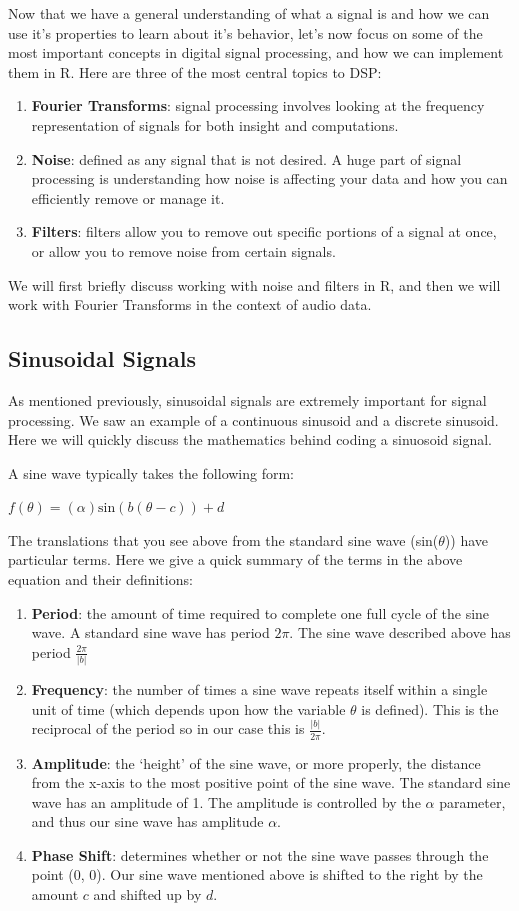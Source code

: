 \documentclass[12pt,oneside]{book}\usepackage[]{graphicx}\usepackage[]{color}
\newcommand{\be}{\begin{enumerate}}
\newcommand{\ee}{\end{enumerate}}
\begin{document}
{{{{Now that we have a general understanding of what a signal is and how we can use it's properties to learn about it's behavior, let's now focus on some of the most important concepts in digital signal processing, and how we can implement them in R. Here are three of the most central topics to DSP:

\be
\item \textbf{Fourier Transforms}: signal processing involves looking at the frequency representation of signals for both insight and computations.
\item \textbf{Noise}: defined as any signal that is not desired. A huge part of signal processing is understanding how noise is affecting your data and how you can efficiently remove or manage it.
\item \textbf{Filters}: filters allow you to remove out specific portions of a signal at once, or allow you to remove noise from certain signals.
\ee

We will first briefly discuss working with noise and filters in R, and then we will work with Fourier Transforms in the context of audio data.

\subsection{Sinusoidal Signals}

As mentioned previously, sinusoidal signals are extremely important for signal processing. We saw an example of a continuous sinusoid and a discrete sinusoid. Here we will quickly discuss the mathematics behind coding a sinuosoid signal. 

A sine wave typically takes the following form:

\begin{center}
$f(\theta) = (\alpha) \text{sin}(b(\theta - c)) + d$
\end{center}

The translations that you see above from the standard sine wave (sin($\theta$)) have particular terms. Here we give a quick summary of the terms in the above equation and their definitions:

\be
\item \textbf{Period}: the amount of time required to complete one full cycle of the sine wave. A standard sine wave has period $2\pi$. The sine wave described above has period $\frac{2\pi}{|b|}$
\item \textbf{Frequency}: the number of times a sine wave repeats itself within a single unit of time (which depends upon how the variable $\theta$ is defined). This is the reciprocal of the period so in our case this is $\frac{|b|}{2\pi}$. 
\item \textbf{Amplitude}: the `height' of the sine wave, or more properly, the distance from the x-axis to the most positive point of the sine wave. The standard sine wave has an amplitude of 1. The amplitude is controlled by the $\alpha$ parameter, and thus our sine wave has amplitude $\alpha$. 
\item \textbf{Phase Shift}: determines whether or not the sine wave passes through the point (0, 0). Our sine wave mentioned above is shifted to the right by the amount $c$ and shifted up by $d$. 
\ee

}}}}
\end{document}

